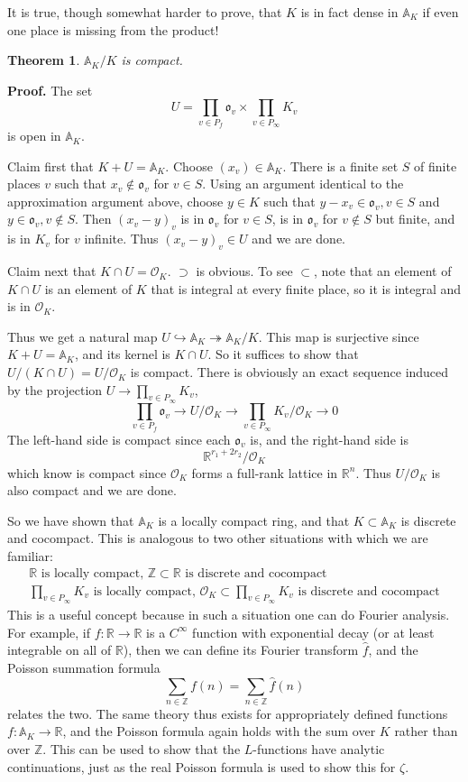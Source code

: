 \documentclass[12pt]{article}
\newcommand{\Ints}{\mathbb{Z}}
\newcommand{\Reals}{\mathbb{R}}
\newcommand{\Ade}{\mathbb{A}}
\newcommand{\Alg}{\mathcal{O}}
\renewcommand{\o}{\mathfrak{o}}
\newtheorem{thm}{Theorem}
\begin{document}
It is true, though somewhat harder to prove, that $K$ is in fact dense in $\Ade_K$ if even one place is missing from the product!

\begin{thm} $\Ade_K/K$ is compact.
\end{thm}
\textbf{Proof. } The set
\[U = \prod_{v\in P_f}\o_v \times \prod_{v\in P_{\infty}} K_v\]
is open in $\Ade_K$.

Claim first that $K+U=\Ade_K$. Choose $(x_v)\in \Ade_K$. There is a finite set $S$ of finite places $v$ such that $x_v\notin \o_v$ for $v\in S$. Using an argument identical to the approximation argument above, choose $y\in K$ such that $y-x_v \in \o_v, v\in S$ and $y\in\o_v, v\notin S$. Then $(x_v-y)_v$ is in $\o_v$ for $v\in S$, is in $\o_v$ for $v\notin S$ but finite, and is in $K_v$ for $v$ infinite. Thus $(x_v-y)_v\in U$ and we are done.

Claim next that $K\cap U = \Alg_K$. $\supset$ is obvious. To see $\subset$, note that an element of $K\cap U$ is an element of $K$ that is integral at every finite place, so it is integral and is in $\Alg_K$.

Thus we get a natural map $U\hookrightarrow \Ade_K \twoheadrightarrow \Ade_K/K$. This map is surjective since $K+U=\Ade_K$, and its kernel is $K\cap U$. So it suffices to show that $U/(K\cap U)=U/\Alg_K$ is compact. There is obviously an exact sequence induced by the projection $U\to\prod_{v\in P_{\infty}} K_v$,
\[\prod_{v\in P_f} \o_v\to U/\Alg_K\to \prod_{v\in P_{\infty}} K_v/\Alg_K\to 0\]
The left-hand side is compact since each $\o_v$ is, and the right-hand side is 
\[\Reals^{r_1+2r_2}/\Alg_K\]
which know is compact since $\Alg_K$ forms a full-rank lattice in $\Reals^n$. Thus $U/\Alg_K$ is also compact and we are done.


So we have shown that $\Ade_K$ is a locally compact ring, and that $K\subset \Ade_K$ is discrete and cocompact. This is analogous to two other situations with which we are familiar:
\begin{gather*}
\Reals\text{ is locally compact, }\Ints\subset\Reals\text{ is discrete and cocompact}\\
\prod_{v\in P_{\infty}}K_v\text{ is locally compact, }\Alg_K\subset\prod_{v\in P_{\infty}}K_v\text{ is discrete and cocompact}
\end{gather*}
This is a useful concept because in such a situation one can do Fourier analysis. For example, if $f:\Reals\to\Reals$ is a $C^{\infty}$ function with exponential decay (or at least integrable on all of $\Reals$), then we can define its Fourier transform $\hat{f}$, and the Poisson summation formula
\[\sum_{n\in\Ints} f(n) = \sum_{n\in\Ints} \hat{f}(n)\]
relates the two. The same theory thus exists for appropriately defined functions $f:\Ade_K\to \Reals$, and the Poisson formula again holds with the sum over $K$ rather than over $\Ints$. This can be used to show that the $L$-functions have analytic continuations, just as the real Poisson formula is used to show this for $\zeta$.

\end{document}
